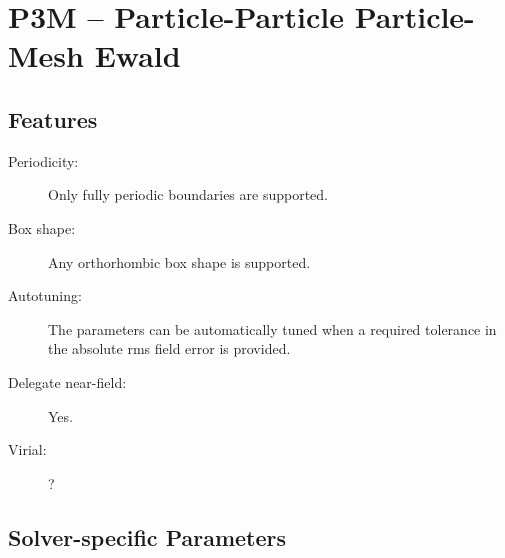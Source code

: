 \chapter{P3M -- Particle-Particle Particle-Mesh Ewald}
\label{cha:p3m}


\section{Features}

\begin{description}
\item[Periodicity:] Only fully periodic boundaries are supported.
\item[Box shape:] Any orthorhombic box shape is supported.
\item[Autotuning:] The parameters can be automatically tuned when a
  required tolerance in the absolute rms field error is provided.
\item[Delegate near-field:] Yes.
\item[Virial:] ?
\end{description}

\section{Solver-specific Parameters}

